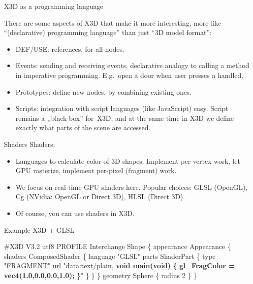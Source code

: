 \documentclass{beamer}
\begin{document}
\begin{frame}{X3D as a programming language}

There are some aspects of X3D that make it more interesting,
more like ``(declarative) programming language'' than just ``3D model format'':

\begin{itemize}
  \item DEF/USE: references, for all nodes.
  \item Events: sending and receiving events,
    declarative analogy to calling a method in imperative programming.
    E.g.~open a door when user presses a handled.
  \item Prototypes: define new nodes,
    by combining existing ones.
  \item Scripts: integration with script languages (like JavaScript) easy.
    Script remains a ,,black box'' for~X3D, and at the same time
    in X3D we define exactly what parts of the scene are accessed.
\end{itemize}
\end{frame}

\begin{frame}{Shaders}
Shaders:
\begin{itemize}
  \item Languages to calculate color of 3D shapes. Implement per-vertex work,
    let GPU rasterize, implement per-pixel (fragment) work.
  \item We focus on real-time GPU shaders here.
    Popular choices: GLSL (OpenGL), Cg (NVidia: OpenGL or Direct 3D),
    HLSL (Direct 3D).
  \item Of course, you can use shaders in X3D.
\end{itemize}
\end{frame}

\begin{frame}[fragile]
\begin{exampleblock}{Example X3D + GLSL}
\begin{semiverbatim}
\#X3D V3.2 utf8
PROFILE Interchange
Shape \{
  appearance Appearance \{
    shaders ComposedShader \{
      language "GLSL"
      parts ShaderPart \{
        type "FRAGMENT"
        url "data:text/plain,
        \textbf{void main(void)}
        \textbf{\{}
          \textbf{gl\_FragColor = vec4(1.0,0.0,0.0,1.0);}
        \textbf{\}}" \} \} \}
  geometry Sphere \{ radius 2 \}
\}
\end{semiverbatim}
\end{exampleblock}
\end{frame}
\end{document}
